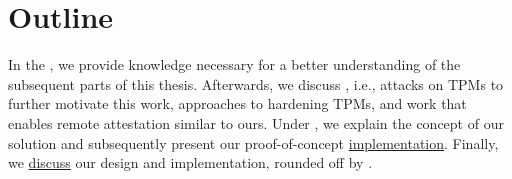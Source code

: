 \section{Outline}

In the , we provide knowledge necessary for a better understanding of the subsequent parts of this thesis.
Afterwards, we discuss , i.e., attacks on TPMs to further motivate this work, approaches to hardening TPMs, and work that enables remote attestation similar to ours.
Under , we explain the concept of our solution and subsequently present our proof-of-concept \hyperref[chapter:implementation]{implementation}.
Finally, we \hyperref[chapter:discussion]{discuss} our design and implementation, rounded off by .

